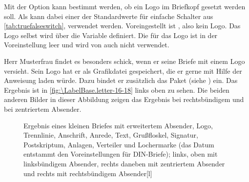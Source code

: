 \begin{Declaration}
\end{Declaration}
%
%
Mit der Option  kann bestimmt werden, ob ein Logo
im Briefkopf gesetzt werden soll. Als  kann dabei einer
der Standardwerte für einfache Schalter aus \autoref{tab:truefalseswitch},
 verwendet
werden. Voreingestellt ist , also kein
Logo. Das Logo selbst wird über die Variable 
definiert. Die  für das Logo ist in der Voreinstellung leer
und wird von \KOMAScript{} auch nicht verwendet.%
\begin{Example}
  Herr Musterfrau findet es besonders schick, wenn er seine Briefe mit einem
  Logo versieht. Sein Logo hat er als Grafikdatei gespeichert, die er gerne
  mit Hilfe der Anweisung  laden würde. Dazu bindet er
  zusätzlich das Paket  (siehe
  \cite{package:graphics}) ein.%
  Das Ergebnis ist in \autoref{fig:\LabelBase.letter-16-18}
  links oben zu sehen. Die beiden anderen Bilder in dieser Abbildung zeigen
  das Ergebnis bei rechtsbündigem und bei zentriertem Absender.
  \begin{figure}
     \setcapindent{0pt}%
     {\hfill
       \quad
       \par\bigskip}
     \begin{captionbeside}{Ergebnis eines kleinen Briefes mit
         erweitertem Absender, Logo, Trennlinie, Anschrift, Anrede, Text,
         Grußfloskel, Signatur, Postskriptum, Anlagen, Verteiler und
         Lochermarke (das Datum entstammt den Voreinstellungen für
         DIN-Briefe); links, oben mit linksbündigem Absender, rechts daneben
         mit zentriertem Absender und rechts mit rechtsbündigem Absender}[l]
       \quad
  \end{captionbeside}
  \label{fig:\LabelBase.letter-16-18}
  \end{figure}
\end{Example}%
%
\EndIndexGroup
\ExampleEndFix%


